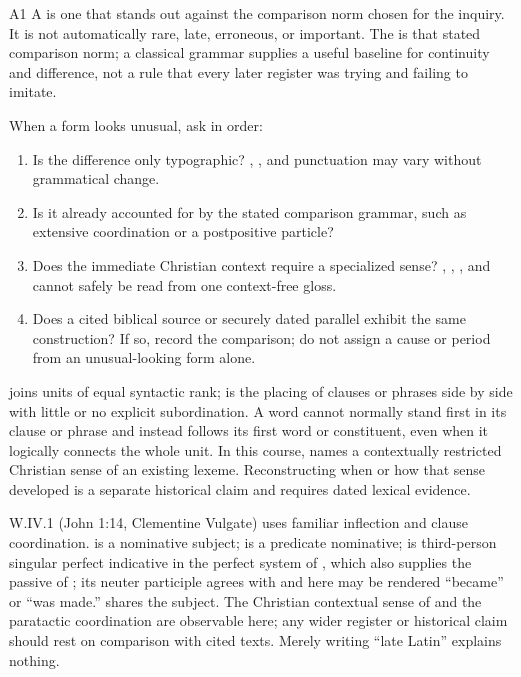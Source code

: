 \begin{courseunit}{A1}
A  is one that stands out against the comparison norm
chosen for the inquiry. It is not automatically rare, late, erroneous, or
important. The  is that stated comparison norm; a classical
grammar supplies a useful baseline for continuity and difference, not a rule
that every later register was trying and failing to imitate.

When a form looks unusual, ask in order:

\begin{enumerate}
  \item Is the difference only typographic? , , and
        punctuation may vary without grammatical change.
  \item Is it already accounted for by the stated comparison grammar, such as
        extensive coordination or a postpositive particle?
  \item Does the immediate Christian context require a specialized sense?
        , , , and
         cannot safely be read from one context-free gloss.
  \item Does a cited biblical source or securely dated parallel exhibit the
        same construction? If so, record the comparison; do not assign a cause
        or period from an unusual-looking form alone.
\end{enumerate}

 joins units of equal syntactic rank;  is
the placing of clauses or phrases side by side with little or no explicit
subordination. A  word cannot normally stand first in its
clause or phrase and instead follows its first word or constituent, even when
it logically connects the whole unit. In this course,  names a contextually restricted Christian sense of an existing
lexeme. Reconstructing when or how that sense developed is a separate
historical claim and requires dated lexical evidence.

\begin{workedexample}{}{W.IV.1}
 (John 1:14,
Clementine Vulgate) uses familiar inflection and clause coordination.
 is a nominative subject;  is a predicate nominative;
 is third-person singular perfect indicative in the perfect
system of , which also supplies the passive of ; its
neuter participle agrees with  and here may be rendered ``became''
or ``was made.''  shares the subject. The Christian contextual
sense of  and the paratactic coordination are observable here;
any wider register or historical claim should rest on comparison with cited
texts. Merely writing ``late Latin'' explains nothing.
\end{workedexample}


\end{courseunit}
